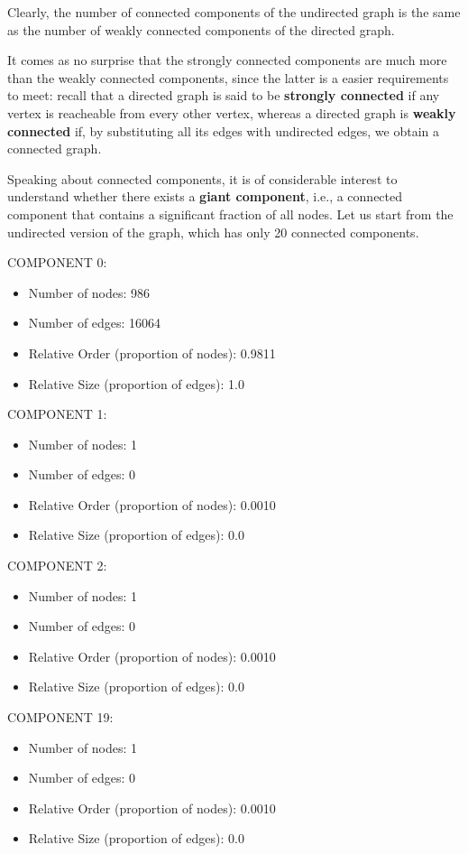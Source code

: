 \documentclass{report}
\theoremstyle{definition}
\theoremstyle{remark}
\begin{document}
Clearly, the number of connected components of the undirected graph is the same as the number of weakly connected components of the directed graph.

It comes as no surprise that the strongly connected components are much more than the weakly connected components, since the latter is a easier requirements to meet: recall that a directed graph is said to be \textbf{strongly connected} if any vertex is reacheable from every other vertex, whereas a directed graph is \textbf{weakly connected} if, by substituting all its edges with undirected edges, we obtain a connected graph.

Speaking about connected components, it is of considerable interest to understand whether there exists a \textbf{giant component}, i.e., a connected component that contains a significant fraction of all nodes. Let us start from the undirected version of the graph, which has only 20 connected components.
\bigskip


COMPONENT 0:
\begin{itemize}
\item Number of nodes: 986
\item Number of edges: 16064
\item Relative Order (proportion of nodes): 0.9811
\item Relative Size (proportion of edges): 1.0\\
\end{itemize}

COMPONENT 1:
\begin{itemize}
\item Number of nodes: 1
\item Number of edges: 0
\item Relative Order (proportion of nodes): 0.0010
\item Relative Size (proportion of edges): 0.0\\
\end{itemize}


COMPONENT 2:
\begin{itemize}
\item Number of nodes: 1
\item Number of edges: 0
\item Relative Order (proportion of nodes): 0.0010
\item Relative Size (proportion of edges): 0.0\\
\end{itemize}


COMPONENT 19:
\begin{itemize}
\item Number of nodes: 1
\item Number of edges: 0
\item Relative Order (proportion of nodes): 0.0010
\item Relative Size (proportion of edges): 0.0\\
\end{itemize}
\end{document}

